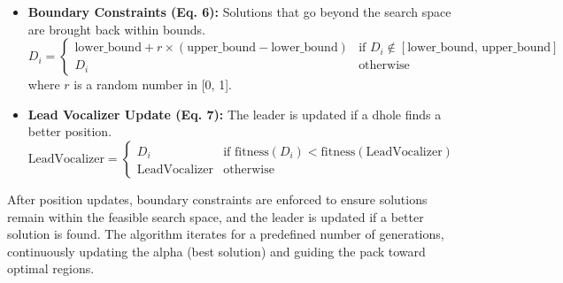 \documentclass[12pt, a4paper]{article}
\begin{document}
\begin{itemize}
    \item \textbf{Boundary Constraints (Eq. 6):} Solutions that go beyond the search space are brought back within bounds.
    \begin{equation}
        D_i = 
        \begin{cases} 
            \text{lower\_bound} + r \times (\text{upper\_bound} - \text{lower\_bound}) & \text{if } D_i \notin [\text{lower\_bound, upper\_bound}] \\
            D_i & \text{otherwise}
        \end{cases}
    \end{equation}
    where $r$ is a random number in [0, 1].

    \item \textbf{Lead Vocalizer Update (Eq. 7):} The leader is updated if a dhole finds a better position.
    \begin{equation}
        \text{LeadVocalizer} = 
        \begin{cases} 
            D_i & \text{if fitness}(D_i) < \text{fitness}(\text{LeadVocalizer}) \\
            \text{LeadVocalizer} & \text{otherwise}
        \end{cases}
    \end{equation}
\end{itemize}

After position updates, boundary constraints are enforced to ensure solutions remain within the feasible search space, and the leader is updated if a better solution is found. The algorithm iterates for a predefined number of generations, continuously updating the alpha (best solution) and guiding the pack toward optimal regions.
\end{document}
